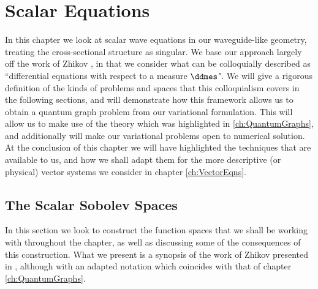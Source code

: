\chapter{Scalar Equations} \label{ch:ScalarEqns}
In this chapter we look at scalar wave equations in our waveguide-like geometry, treating the cross-sectional structure as singular.
We base our approach largely off the work of Zhikov \cite{zhikov2000extension}, in that we consider what can be colloquially described as ``differential equations with respect to a measure $\ddmes$".
We will give a rigorous definition of the kinds of problems and spaces that this colloquialism covers in the following sections, and will demonstrate how this framework allows us to obtain a quantum graph problem from our variational formulation.
This will allow us to make use of the theory which was highlighted in \ref{ch:QuantumGraphs}, and additionally will make our variational problems open to numerical solution.
At the conclusion of this chapter we will have highlighted the techniques that are available to us, and how we shall adapt them for the more descriptive (or physical) vector systems we consider in chapter \ref{ch:VectorEqns}.

\section{The Scalar Sobolev Spaces} \label{sec:ScalarSobSpaces}
In this section we look to construct the function spaces that we shall be working with throughout the chapter, as well as discussing some of the consequences of this construction.
What we present is a synopsis of the work of Zhikov presented in \cite{zhikov2000extension}, although with an adapted notation which coincides with that of chapter \ref{ch:QuantumGraphs}. \newline

